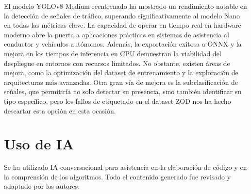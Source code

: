 \documentclass[11pt,a4paper]{article}
\begin{document}
El modelo YOLOv8 Medium reentrenado ha mostrado un rendimiento notable en la detección de señales de tráfico,
superando significativamente al modelo Nano en todas las métricas clave. La capacidad de operar en tiempo
real en hardware moderno abre la puerta a aplicaciones prácticas en sistemas de asistencia al conductor y vehículos autónomos.
Además, la exportación exitosa a ONNX y la mejora en los tiempos de inferencia en CPU demuestran la viabilidad del despliegue en entornos con recursos limitados.
No obstante, existen áreas de mejora, como la optimización del dataset de entrenamiento y la exploración de arquitecturas más avanzadas.
Otra gran vía de mejora es la subclasificación de señales, que permitiría no solo detectar su presencia, sino también identificar su tipo específico, 
pero los fallos de etiquetado en el dataset ZOD nos ha hecho descartar esta opción en esta ocasión.

\clearpage

\section*{Uso de IA}

Se ha utilizado IA conversacional para asistencia en la elaboración de código y en la comprensión de los algoritmos. Todo el contenido generado fue revisado y adaptado por los autores.



\end{document}
